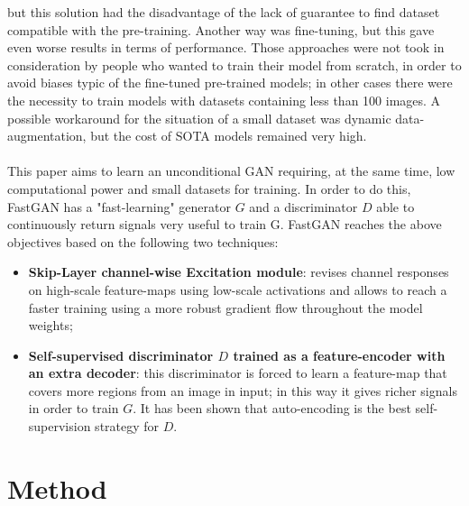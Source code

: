 \documentclass[12pt]{article}
\begin{document}
but this solution had the disadvantage of the lack of guarantee to find dataset compatible with the pre-training. 
Another way was fine-tuning, but this gave even worse results in terms of performance.
Those approaches were not took in consideration by people who wanted to train their model from scratch, in order to 
avoid biases typic of the fine-tuned pre-trained models; in other cases there were the necessity to train models
with datasets containing less than 100 images.
A possible workaround for the situation of a small dataset was dynamic data-augmentation, but the cost of SOTA models
remained very high.\\\\
This paper aims to learn an unconditional GAN requiring, at the same time, low computational power and small datasets
for training. In order to do this, FastGAN has a "fast-learning" generator $G$ and a discriminator $D$ able to continuously
return signals very useful to train G. FastGAN reaches the above objectives based on the following two techniques:
\begin{itemize}
	\setlength\itemsep{0.01em}
	\item \textbf{Skip-Layer channel-wise Excitation module}: revises channel responses on high-scale feature-maps using
			low-scale activations and allows to reach a faster training using a more robust gradient flow throughout the 
			model weights;
	\item \textbf{Self-supervised discriminator $D$ trained as a feature-encoder with an extra decoder}: this discriminator
			is forced to learn a feature-map that covers more regions from an image in input; in this way it gives richer
			signals in order to train $G$. It has been shown that auto-encoding is the best self-supervision strategy for $D$.
\end{itemize} 


\section{Method}
\large	
\end{document}
